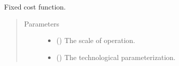 \documentclass[letterpaper,10pt,english]{sphinxmanual}
\begin{document}
\begin{fulllineitems}
\label{\detokenize{technology:technology.simple_electrolysis.fixed_cost}}
Fixed cost function.
\begin{quote}\begin{description}
\item[{Parameters}] \leavevmode\begin{itemize}
\item {} 
 () \textendash{} The scale of operation.

\item {} 
 () \textendash{} The technological parameterization.

\end{itemize}

\end{description}\end{quote}

\end{fulllineitems}

\end{document}
